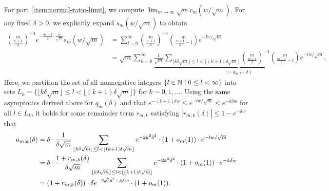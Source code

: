 For part~\ref{item:normal-ratio-limit}, we compute $\lim_{m \to \infty}
\sqrt{m} c_m(w/\sqrt{m})$. For any fixed $\delta > 0$, we explicitly expand
$s_m(w/\sqrt{m})$ to obtain
\begin{align*}
	\binom{m}{\frac{m+1}{2}}^{-1} e^{-\frac{m-1}{2} \cdot \frac{w}{\sqrt{m}}} s_m(w/\sqrt{m}) & = \sum_{l=0}^\infty \binom{m}{\frac{m+1}{2}}^{-1} \binom{m}{\frac{m+1}{2} - l} e^{-lw/\sqrt{m}} \nonumber \\
	& = \sqrt{m}  \sum_{k=0}^{\infty} \underbrace{\frac{1}{\sqrt{m} }\sum_{\lfloor k \delta \sqrt{m} \rfloor \leq l < \lfloor (k+1) \delta \sqrt{m}  \rfloor} \binom{m}{\frac{m+1}{2}}^{-1} \binom{m}{\frac{m+1}{2} - l} e^{-lw/\sqrt{m}}}_{:=a_{m,k}(\delta)}.
\end{align*}
Here, we partition the set of all nonnegative integers $\{l \in \mathbb{N} \mid 0
\leq l < \infty\}$ into sets $L_k = \{\lfloor k \delta \sqrt{m} \rfloor
\leq l < \lfloor (k+1) \delta \sqrt{m} \rfloor \}$ for $k = 0, 1, \ldots$.
Using the same asymptotics derived
above for $q_m(\delta)$ and that $e^{-(k+1) \delta w} \leq e^{-lw/\sqrt{m}}
\leq e^{-k \delta w} $ for all $l \in L_k$, it holds for some
remainder term $r_{m,k}$ satisfying
$|r_{m,k}(\delta)| \leq 1 - e^{-\delta w}$ that
\begin{align*}
	a_{m,k}(\delta) & = \delta \cdot \frac{1}{\delta \sqrt{m}} \sum_{\lfloor k \delta \sqrt{m} \rfloor \leq l < \lfloor (k+1) \delta \sqrt{m}  \rfloor} e^{-2k^2 \delta^2}  \cdot (1 + o_m(1)) \cdot  e^{-lw/\sqrt{m}} \nonumber \\
	& = \delta \cdot \frac{1 + r_{m,k}(\delta)}{\delta \sqrt{m}} \sum_{\lfloor k \delta \sqrt{m} \rfloor \leq l < \lfloor (k+1) \delta \sqrt{m}  \rfloor} e^{-2k^2 \delta^2}  \cdot (1 + o_m(1)) \cdot  e^{-k \delta w} \nonumber \\
	& = \left({1 + r_{m,k}(\delta)}\right) \cdot \delta e^{-2k^2 \delta^2-k\delta w} \cdot (1 + o_m(1)).
\end{align*}


